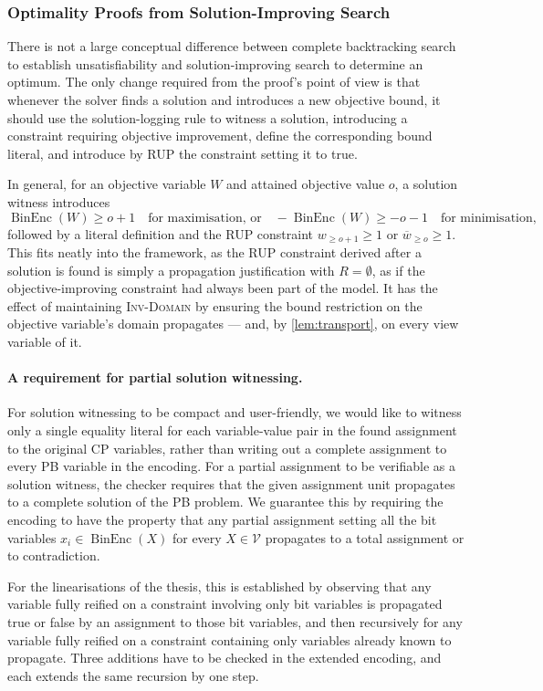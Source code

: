 \documentclass[11pt,a4paper]{article}
\theoremstyle{plain}
\theoremstyle{definition}
\theoremstyle{remark}
\newcommand{\fname}[1]{\ensuremath{\operatorname{#1}}}
\newcommand{\BinEnc}{\fname{BinEnc}}
\newcommand{\atge}[2]{#1_{\geq #2}}
\newcommand{\natge}[2]{\overline{#1}_{\geq #2}}
\newcommand{\inv}[1]{\textnormal{\textsc{Inv-#1}}}
\newcommand{\invDomain}{\inv{Domain}}
\begin{document}
\subsubsection{Optimality Proofs from Solution-Improving Search}
\label{sec:optimality}

There is not a large conceptual difference between complete backtracking search
to establish unsatisfiability and solution-improving search to determine an
optimum.  The only change required from the proof's point of view is that
whenever the solver finds a solution and introduces a new objective bound, it
should use the solution-logging rule to witness a solution, introducing a
constraint requiring objective improvement, define the corresponding bound
literal, and introduce by RUP the constraint setting it to true.

In general, for an objective variable $W$ and attained objective value $o$, a
solution witness introduces
\[
  \BinEnc(W) \geq o+1 \quad\text{for maximisation, or}\quad
  -\BinEnc(W) \geq -o-1 \quad\text{for minimisation,}
\]
followed by a literal definition and the RUP constraint $\atge{w}{o+1}\geq 1$ or
$\natge{w}{o}\geq 1$.  This fits neatly into the framework, as the RUP
constraint derived after a solution is found is simply a propagation
justification with $R=\emptyset$, as if the objective-improving constraint had
always been part of the model.  It has the effect of maintaining \invDomain{} by
ensuring the bound restriction on the objective variable's domain propagates ---
and, by \cref{lem:transport}, on every view variable of it.

\paragraph{A requirement for partial solution witnessing.}
For solution witnessing to be compact and user-friendly, we would like to
witness only a single equality literal for each variable-value pair in the found
assignment to the original CP variables, rather than writing out a complete
assignment to every PB variable in the encoding.  For a partial assignment to be
verifiable as a solution witness, the checker requires that the given assignment
unit propagates to a complete solution of the PB problem.  We guarantee this by
requiring the encoding to have the property that any partial assignment setting
all the bit variables $x_i\in\BinEnc(X)$ for every $X\in\mathcal V$ propagates
to a total assignment or to contradiction.

For the linearisations of the thesis, this is established by observing that any
variable fully reified on a constraint involving only bit variables is
propagated true or false by an assignment to those bit variables, and then
recursively for any variable fully reified on a constraint containing only
variables already known to propagate.  Three additions have to be checked in the
extended encoding, and each extends the same recursion by one step.
\end{document}
